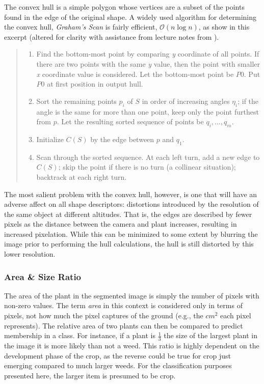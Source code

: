 \documentclass[letterpaper]{article}
\begin{document}
{{\begin{figure}[h!]
\end{figure}
The convex hull is a simple polygon whose vertices are a subset of the points found in the edge of the original shape. A widely used algorithm for determining the convex hull, \textit{Graham's Scan} is fairly efficient, $\mathcal{O}(n\log n)$, as \citeauthor{Klette2004-qz} show in this excerpt (altered for clarity with assistance from lecture notes from \citeauthor{Prosser1998-mi}). \parencite{Klette2004-qz}
\begin{quote}
\begin{enumerate}
	\item{Find the bottom-most point by comparing \textit{y} coordinate of all points. If there are two points with the same \textit{y} value, then the point with smaller \textit{x} coordinate value is considered. Let the bottom-most point be $P0$. Put $P0$ at first position in output hull.}
	\item{Sort the remaining points $p_i$ of $S$ in order of increasing angles $\eta_i$; if the angle is the same for more than one point, keep only the point furthest from $p$. Let the resulting sorted sequence of points be $q_i,..., q_m$.}
	\item{Initialize $C(S)$ by the edge between $p$ and $q_1$.}
	\item{Scan through the sorted sequence. At each left turn, add a new edge to $C(S)$; skip the point if there is no turn (a collinear situation); backtrack at each right turn.}
\end{enumerate}
\end{quote}
The most salient problem with the convex hull, however, is one that will have an adverse affect on all shape descriptors: distortions introduced by the resolution of the same object at different altitudes. That is, the edges are described by fewer pixels as the distance between the camera and plant increases, resulting in increased pixelation. While this can be minimized to some extent by blurring the image prior to performing the hull calculations, the hull is still distorted by this lower resolution.

\subsubsection{Area \& Size Ratio}
The area of the plant in the segmented image is simply the number of pixels with non-zero values. The term \textit{area} in this context is considered only in terms of pixels, not how much the pixel captures of the ground (e.g., the $cm^2$ each pixel represents). The relative area of two plants can then be compared to predict membership in a class. For instance, if a plant is $\frac{1}{3}$ the size of the largest plant in the image it is more likely than not a weed. This ratio is highly dependent on the development phase of the crop, as the reverse could be true for crop just emerging compared to much larger weeds. For the classification purposes presented here, the larger item is presumed to be crop.

}}
\end{document}

